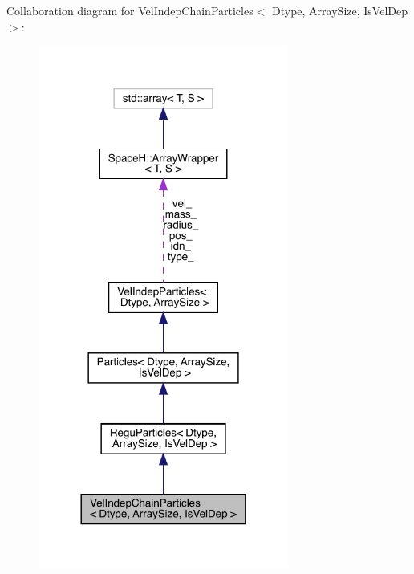 Collaboration diagram for Vel\+Indep\+Chain\+Particles$<$ Dtype, Array\+Size, Is\+Vel\+Dep $>$\+:
\nopagebreak
\begin{figure}[H]
\begin{center}
\leavevmode
\includegraphics[width=233pt]{class_vel_indep_chain_particles__coll__graph}
\end{center}
\end{figure}
